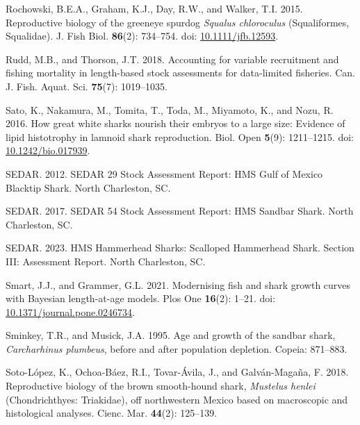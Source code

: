 \documentclass[
]{article}
\newenvironment{CSLReferences}%
  {}%
  {\par}
\begin{document}
\begin{CSLReferences}{1}{0}
Rochowski, B.E.A., Graham, K.J., Day, R.W., and Walker, T.I. 2015. Reproductive biology of the greeneye spurdog \emph{{Squalus} chloroculus} ({Squaliformes}, {Squalidae}). J. Fish Biol. \textbf{86}(2): 734--754. doi: \href{https://doi.org/10.1111/jfb.12593}{10.1111/jfb.12593}.

Rudd, M.B., and Thorson, J.T. 2018. Accounting for variable recruitment and fishing mortality in length-based stock assessments for data-limited fisheries. Can. J. Fish. Aquat. Sci. \textbf{75}(7): 1019--1035.

Sato, K., Nakamura, M., Tomita, T., Toda, M., Miyamoto, K., and Nozu, R. 2016. How great white sharks nourish their embryos to a large size: Evidence of lipid histotrophy in lamnoid shark reproduction. Biol. Open \textbf{5}(9): 1211--1215. doi: \href{https://doi.org/10.1242/bio.017939}{10.1242/bio.017939}.

SEDAR. 2012. {SEDAR} 29 {Stock} {Assessment} {Report}: {HMS} {Gulf} of {Mexico} {Blacktip} {Shark}. North Charleston, SC.

SEDAR. 2017. {SEDAR} 54 {Stock} {Assessment} {Report}: {HMS} {Sandbar} {Shark}. North Charleston, SC.

SEDAR. 2023. {HMS} {Hammerhead} {Sharks}: {Scalloped} {Hammerhead} {Shark}. {Section} {III}: {Assessment} {Report}. North Charleston, SC.

Smart, J.J., and Grammer, G.L. 2021. Modernising fish and shark growth curves with {Bayesian} length-at-age models. Plos One \textbf{16}(2): 1--21. doi: \href{https://doi.org/10.1371/journal.pone.0246734}{10.1371/journal.pone.0246734}.

Sminkey, T.R., and Musick, J.A. 1995. Age and growth of the sandbar shark, \emph{{Carcharhinus} plumbeus}, before and after population depletion. Copeia: 871--883.

Soto-López, K., Ochoa-Báez, R.I., Tovar-Ávila, J., and Galván-Magaña, F. 2018. Reproductive biology of the brown smooth-hound shark, \emph{{Mustelus} henlei} ({Chondrichthyes}: {Triakidae}), off northwestern {Mexico} based on macroscopic and histological analyses. Cienc. Mar. \textbf{44}(2): 125--139.


\end{CSLReferences}
\end{document}
